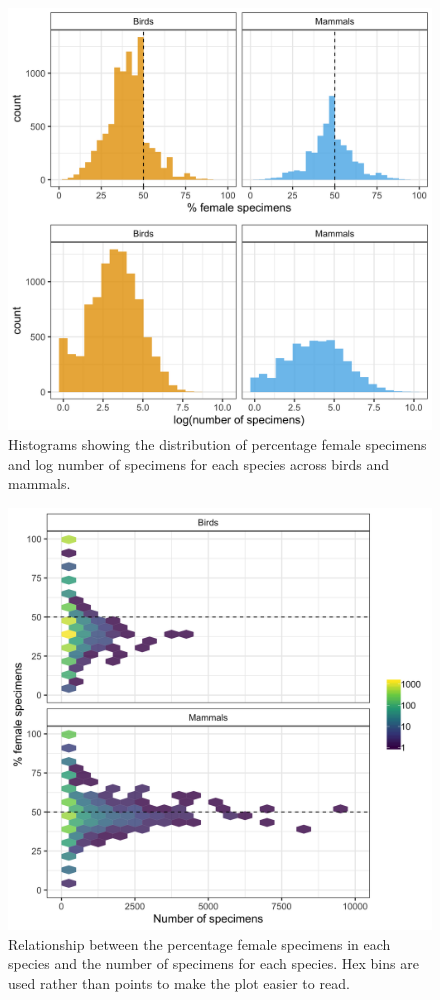 \documentclass[a4paper, 12pt]{article}
\begin{document}
\begin{figure}
 \centering
  \includegraphics[width = \linewidth]{figures/histogram-specimen-counts.png}
  \caption{Histograms showing the distribution of percentage female specimens and log number of specimens for each species across birds and mammals.}
  \label{fig-histograms}
\end{figure}

\begin{figure}
 \centering
  \includegraphics[width = \linewidth]{figures/specimens-numbers-all.png}
  \caption{Relationship between the percentage female specimens in each species and the number of specimens for each species. 
  Hex bins are used rather than points to make the plot easier to read.}
  \label{fig-hex}
\end{figure}
\end{document}
